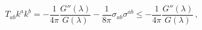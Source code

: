 \begin{equation}
T_{ab} k^a k^b = -\frac{1}{4\pi} \frac{G''(\lambda)}{G(\lambda)} -
\frac{1}{8\pi} \sigma_{ab} \sigma^{ab} \leq -\frac{1}{4\pi}
\frac{G''(\lambda)}{G(\lambda)}\, ,
\label{eqray2}
\end{equation}

